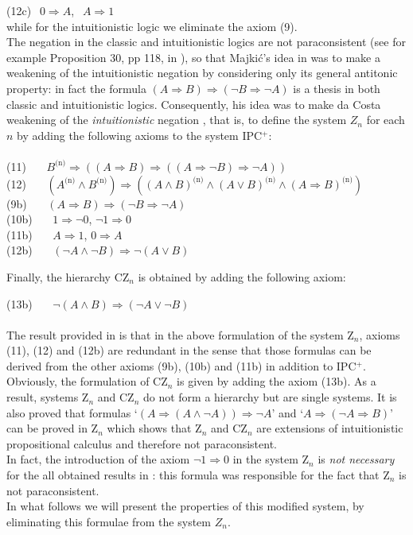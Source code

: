\documentclass{llncs}
\begin{document}
(12c) $~~0 \Rightarrow A$, $~~A \Rightarrow 1$ \\
while for the intuitionistic logic we eliminate the
axiom (9).\\
 The negation in the classic and intuitionistic logics are not paraconsistent
 (see for example Proposition 30, pp 118, in \cite{Majk06ml}), so
 that  Majki\'c's idea in \cite{Majk08dc} was to make a weakening
 of the intuitionistic negation by considering only its general
 antitonic property: in fact the formula $(A\Rightarrow B) \Rightarrow (\neg
 B \Rightarrow \neg A)$ is a thesis in both classic and intuitionistic
 logics. Consequently, his idea was to make  da Costa weakening of the \emph{intuitionistic} negation \cite{Majk08dc}, that is, to define the system $Z_n$
for each $n$ by adding the following axioms to the system IPC$^+$:\\\\
\noindent (11) \ \ \ $B^{\text{(n)}} \Rightarrow ((A \Rightarrow B)
\Rightarrow
((A \Rightarrow \neg B) \Rightarrow \neg A))$\\
\noindent (12) \ \ \ $(A^{\text{(n)}} \land B^{\text{(n)}})
\Rightarrow ((A \land B)^{\text{(n)}} \land (A \lor B)^{\text{(n)}}
\land (A
\Rightarrow B)^{\text{(n)}})$\\
\noindent (9b) \ \ \ $(A \Rightarrow B) \Rightarrow (\neg B
\Rightarrow \neg A)$\\
\noindent (10b) \ \ \ $1 \Rightarrow \neg 0$, $\neg 1 \Rightarrow 0$\\
\noindent (11b) \ \ \ $A \Rightarrow 1$, $0 \Rightarrow A$\\
\noindent (12b) \ \ \ $(\neg A \land \neg B) \Rightarrow \neg (A
\lor B)$

\noindent Finally, the hierarchy CZ$_n$ is obtained by adding the
following axiom:

\vskip3pt

\noindent (13b) \ \ \ $\neg (A \land B) \Rightarrow (\neg A \lor
\neg B)$\\\\
The result provided in \cite{OmWa10} is that in the above
formulation of the system Z$_n$, axioms (11), (12) and (12b) are
redundant in the sense that those formulas can be derived from the
other axioms (9b), (10b) and (11b) in addition to IPC$^+$.
Obviously, the formulation of CZ$_n$ is given by adding the axiom
(13b). As a result, systems Z$_n$ and CZ$_n$ do not form a hierarchy
but are single systems. It is also proved that formulas
`$(A\Rightarrow (A\land \neg A))\Rightarrow \neg A$' and
`$A\Rightarrow (\neg A\Rightarrow B)$' can be proved in Z$_n$ which
shows that Z$_n$ and CZ$_n$ are extensions of intuitionistic
propositional calculus and therefore not
paraconsistent.\\
In fact, the introduction of the axiom $\neg 1 \Rightarrow 0$ in the
system Z$_n$ is \emph{not necessary} for the all obtained results in
\cite{Majk08dc}: this formula was responsible for the fact that
Z$_n$ is not paraconsistent.\\
In what follows we will present the properties of this modified
system, by eliminating this formulae from the system $Z_n$.
\end{document}
